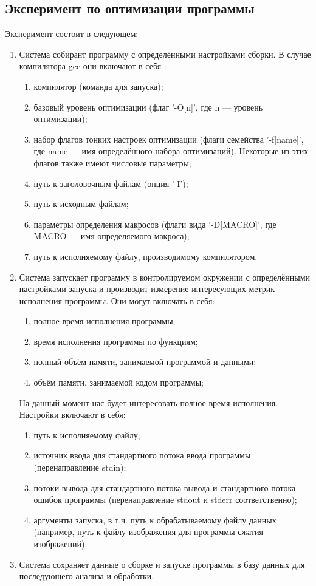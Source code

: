 \subsection{Эксперимент по оптимизации программы}
Эксперимент состоит в следующем:
\begin{enumerate}
	\item Система собирант программу с определёнными настройками сборки. В случае компилятора gcc они включают в себя \cite{gcc-options}:
	\begin{enumerate}
		\item компилятор (команда для запуска);
		\item базовый уровень оптимизации (флаг '-O[n]', где n --- уровень оптимизации);
		\item набор флагов тонких настроек оптимизации (флаги семейства '-f[name]', где name --- имя определённого набора оптимизаций). Некоторые из этих флагов также имеют числовые параметры;
		\item путь к заголовочным файлам (опция '-I');
		\item путь к исходным файлам;
		\item параметры определения макросов (флаги вида '-D[MACRO]', где MACRO --- имя определяемого макроса);
		\item путь к исполняемому файлу, производимому компилятором.
	\end{enumerate}
	\item Система запускает программу в контролируемом окружении с определёнными настройками запуска и производит измерение интересующих метрик исполнения программы. Они могут включать в себя:
	\begin{enumerate}
		\item полное время исполнения программы;
		\item время исполнения программы по функциям;
		\item полный объём памяти, занимаемой программой и данными;
		\item объём памяти, занимаемой кодом программы;
	\end{enumerate}
	На данный момент нас будет интересовать полное время исполнения.
	Настройки включают в себя:
	\begin{enumerate}
		\item путь к исполняемому файлу;
		\item источник ввода для стандартного потока ввода программы (перенаправление stdin);
		\item потоки вывода для стандартного потока вывода и стандартного потока ошибок программы (перенаправление stdout и stderr соответственно);
		\item аргументы запуска, в т.ч. путь к обрабатываемому файлу данных (например, путь к файлу изображения для программы сжатия изображений).
	\end{enumerate}
	\item Система сохраняет данные о сборке и запуске программы в базу данных для последующего анализа и обработки.
\end{enumerate}
